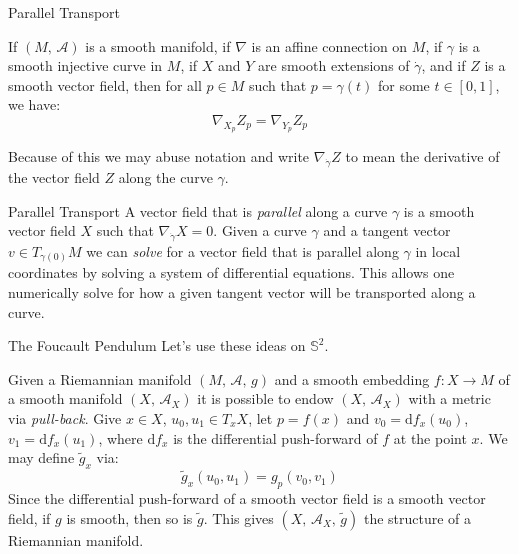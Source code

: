 \documentclass{beamer}
\begin{document}
    \begin{frame}{Parallel Transport}
        \begin{theorem}
            If $(M,\,\mathcal{A})$ is a smooth manifold, if $\nabla$ is an
            affine connection on $M$, if $\gamma$ is a smooth injective curve
            in $M$, if $X$ and $Y$ are smooth extensions of $\dot{\gamma}$,
            and if $Z$ is a smooth vector field, then for all $p\in{M}$ such
            that $p=\gamma(t)$ for some $t\in[0,1]$, we have:
            \begin{equation}
                \nabla_{X_{p}}Z_{p}=\nabla_{Y_{p}}Z_{p}
            \end{equation}
        \end{theorem}
        Because of this we may abuse notation and write
        $\nabla_{\dot{\gamma}}Z$ to mean the derivative of the vector field $Z$
        along the curve $\gamma$.
    \end{frame}
    \begin{frame}{Parallel Transport}
        A vector field that is \textit{parallel} along a curve $\gamma$ is a
        smooth vector field $X$ such that $\nabla_{\dot{\gamma}}X=0$. Given a
        curve $\gamma$ and a tangent vector $v\in{T}_{\gamma(0)}M$ we can
        \textit{solve} for a vector field that is parallel along $\gamma$ in
        local coordinates by solving a system of differential equations. This
        allows one numerically solve for how a given tangent vector will be
        transported along a curve.
    \end{frame}
    \begin{frame}{The Foucault Pendulum}
        Let's use these ideas on $\mathbb{S}^{2}$.
        \par\hfill\par
        Given a Riemannian manifold $(M,\,\mathcal{A},\,g)$
        and a smooth embedding
        $f:X\rightarrow{M}$ of a smooth manifold $(X,\,\mathcal{A}_{X})$ it is
        possible to endow $(X,\,\mathcal{A}_{X})$ with a metric via
        \textit{pull-back}. Give $x\in{X}$, $u_{0},u_{1}\in{T}_{x}X$, let
        $p=f(x)$ and $v_{0}=\textrm{d}f_{x}(u_{0})$,
        $v_{1}=\textrm{d}f_{x}(u_{1})$, where $\textrm{d}f_{x}$ is the
        differential push-forward of $f$ at the point $x$. We may define
        $\tilde{g}_{x}$ via:
        \begin{equation}
            \tilde{g}_{x}(u_{0},u_{1})=g_{p}(v_{0},v_{1})
        \end{equation}
        Since the differential push-forward of a smooth vector field is a
        smooth vector field, if $g$ is smooth, then so is $\tilde{g}$. This
        gives $(X,\,\mathcal{A}_{X},\,\tilde{g})$ the structure of a Riemannian
        manifold.
    \end{frame}
\end{document}
